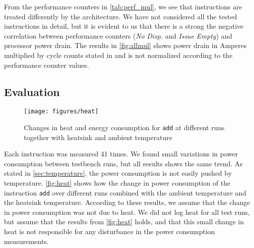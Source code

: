From the performance counters in \autoref{tab:perf_mul}, we see that
instructions are treated differently by the architecture. We have not considered
all the tested instructions in detail, but it is evident to us that there is a
strong the negative correlation between performance counters (\emph{No Disp.}
and \emph{Issue Empty}) and processor power drain. The results in
\autoref{fig:allmul} shows power drain in Amperes multiplied by cycle counts
stated in \cite{armtech} and is not normalized according to the performance
counter values.

\subsection{Evaluation}
\begin{figure}
    \centering
    \texttt{[image: figures/heat]}
    \caption{Changes in heat and energy consumption for \texttt{add} at
    different runs together with heatsink and ambient temperature}
    \label{fig:heat}
\end{figure}

Each instruction was measured 41 times. We found small variations in power
consumption between testbench runs, but all results shows the same trend.  As
stated in \autoref{sec:temperature}, the power consumption is not easily pushed
by temperature. \autoref{fig:heat} shows how the change in power consumption of
the instruction \texttt{add} over different runs combined with the ambient
temperature and the heatsink temperature. According to these results, we assume
that the change in power consumption was not due to heat. We did not log heat
for all test runs, but assume that the results from \autoref{fig:heat} holds,
and that this small change in heat is not responsible for any disturbance in the
power consumption measurements.
